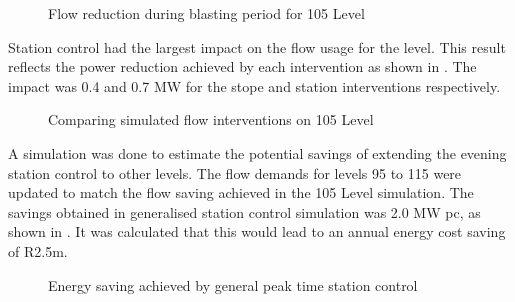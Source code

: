 	\begin{figure}[h!]
		\centering
		
		\caption{Flow reduction during blasting period for 105 Level}
		\label{fig: 105 Flow savings}
	\end{figure}
Station control had the largest impact on the flow usage for the level. This result reflects the power reduction achieved by each intervention as shown in . The impact was 0.4 and 0.7 MW for the stope and station interventions respectively.
	
	\begin{figure}[h!]
		\centering
		
		\caption{Comparing simulated flow interventions on 105 Level}
		\label{fig: Station vs stope}
	\end{figure}
A simulation was done to estimate the potential savings of extending the evening station control to other levels.  The flow demands for levels 95 to 115 were updated to match the flow saving achieved in the 105 Level simulation. The savings obtained in generalised station control simulation was 2.0 MW \gls{pc}, as shown in . It was calculated that this would lead to an annual energy cost saving of R2.5m.
\begin{figure}[h!]
	\centering
	
	\caption{Energy saving achieved by general peak time station control }
	\label{fig: General station optimise}
\end{figure}
